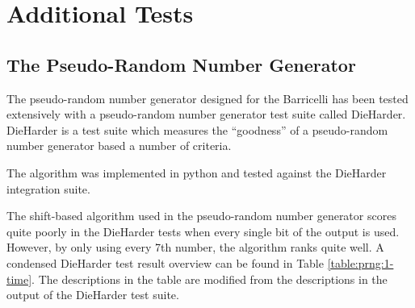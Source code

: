 \section{Additional Tests}

\subsection{The Pseudo-Random Number Generator}


The pseudo-random number generator designed for the Barricelli has been tested extensively with a pseudo-random number generator test suite called DieHarder\cite{dieharder}.
DieHarder is a test suite which measures the ``goodness'' of a pseudo-random number generator based a number of criteria.

The algorithm was implemented in python and tested against the DieHarder integration suite.

The shift-based algorithm used in the pseudo-random number generator scores quite poorly in the DieHarder tests when every single bit of the output is used.
However, by only using every 7th number, the algorithm ranks quite well.
A condensed DieHarder test result overview can be found in Table \vref{table:prng:1-time}.
The descriptions in the table are modified from the descriptions in the output of the DieHarder test suite.

